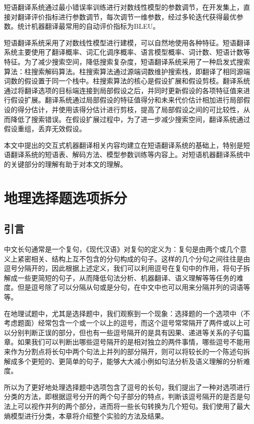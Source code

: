 \documentclass[master, winfont]{njuthesis}
\begin{document}
短语翻译系统通过最小错误率训练进行对数线性模型的参数调节，在开发集上，直接对翻译评价指标进行参数调节，每次调节一维参数，经过多轮迭代获得最优参数。统计机器翻译最常用的自动评价指标为BLEU。

短语翻译系统采用了对数线性模型进行建模，可以自然地使用各种特征。短语翻译系统主要使用了翻译概率、词汇化调序概率、语言模型概率、词计数、短语计数等特征。为了减少搜索空间，降低搜索复杂度，短语翻译系统采用了一种启发式搜索算法：柱搜索解码算法。柱搜索算法通过源端词数维护搜索栈，即翻译了相同源端词数的假设置于同一个栈中。柱搜索算法的核心是假设扩展和假设剪枝。翻译系统通过将翻译选项的目标端连接到局部假设之后，并同时更新假设的各项特征值来进行假设扩展。翻译系统通过局部假设的特征值得分和未来代价估计相加进行局部假设的得分估计，并使用该得分估计进行剪枝，提高了局部假设之间的可比较性，从而降低了搜索错误。在假设扩展过程中，为了进一步减少搜索空间，翻译系统通过假设重组，丢弃无效假设。

本文中提出的交互式机器翻译相关内容均建立在短语翻译系统的基础上，特别是短语翻译系统的短语表、解码方法、模型参数训练等内容上。对短语机器翻译系统中的关键部分的理解有助于对本文的理解。

\chapter{地理选择题选项拆分}
\label{chapter:split}
\section{引言}
中文长句通常是一个复句，《现代汉语》对复句的定义为：复句是由两个或几个意义上紧密相关、结构上互不包含的分句构成的句子\cite{zhou2008}。这样的几个分句之间往往是由逗号分隔开的，因此根据上述定义，我们可以利用逗号在复句中的作用，将句子拆解成一些更简短的句子，从而降低句法分析、机器翻译、语义理解等等任务的难度。但是逗号除了可以分隔从句或是分句，在中文中也可以用来分隔并列的词语等等。

在地理试题中，尤其是选择题中，我们观察到一个现象：选择题的一个选项中（不考虑题面）经常包含一个或一个以上的逗号，而这个逗号常常隔开了两件或以上可以分别判断正误的部分，但也有一些逗号隔开的是具有因果、递进等关系的子句篇章。如果我们可以判断出哪些逗号隔开的是相对独立的两件事情，哪些逗号不能用来作为分割点将长句中两个句法上并列的部分隔开，则可以将较长的一个陈述句拆解成多个更短的、更简单的句子，能够大大减小例如句法分析及语义理解的分析难度。

所以为了更好地处理选择题中选项包含了逗号的长句，我们提出了一种对选项进行分类的方法，即根据逗号分开的两个句子部分的特点，判断该逗号隔开的是否是句法上可以视作并列的两个部分，进而将一些长句转换为几个短句。我们使用了最大熵模型进行分类，本章将介绍整个实验的方法及结果。
\end{document}

